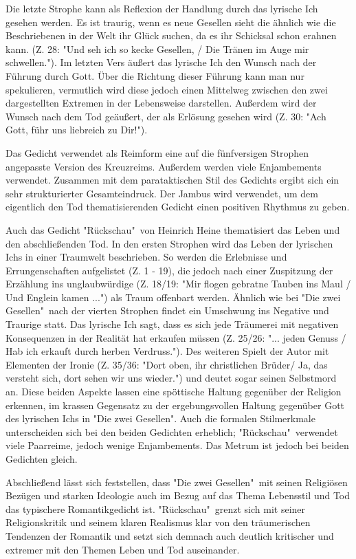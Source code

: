 \documentclass[11pt]{article}
\begin{document}
Die letzte Strophe kann als Reflexion der Handlung durch das lyrische Ich gesehen werden. Es ist traurig, wenn es neue Gesellen sieht die ähnlich wie die Beschriebenen in der Welt ihr Glück suchen, da es ihr Schicksal schon erahnen kann. (Z. 28: "Und seh ich so kecke Gesellen, /  Die Tränen im Auge mir schwellen."). Im letzten Vers äußert das lyrische Ich den Wunsch nach der Führung durch Gott. Über die Richtung dieser Führung kann man nur spekulieren, vermutlich wird diese jedoch einen Mittelweg zwischen den zwei dargestellten Extremen in der Lebensweise darstellen. Außerdem wird der Wunsch nach dem Tod geäußert, der als Erlösung gesehen wird (Z. 30: "Ach Gott, führ uns liebreich zu Dir!").

Das Gedicht verwendet als Reimform eine auf die fünfversigen Strophen angepasste Version des Kreuzreims. Außerdem werden viele Enjambements verwendet. Zusammen mit dem parataktischen Stil des Gedichts ergibt sich ein sehr strukturierter Gesamteindruck. Der Jambus wird verwendet, um dem eigentlich den Tod thematisierenden Gedicht einen positiven Rhythmus zu geben. 

Auch das Gedicht "Rückschau"\ von Heinrich Heine thematisiert das Leben und den abschließenden Tod. In den ersten Strophen wird das Leben der lyrischen Ichs in einer Traumwelt beschrieben. So werden die Erlebnisse und Errungenschaften aufgelistet (Z. 1 - 19), die jedoch nach einer Zuspitzung der Erzählung ins unglaubwürdige (Z. 18/19: "Mir flogen gebratne Tauben ins Maul / Und Englein kamen ...") als Traum  offenbart werden. Ähnlich wie bei "Die zwei Gesellen"\ nach der vierten Strophen findet ein Umschwung ins Negative und Traurige statt. Das lyrische Ich sagt, dass es sich jede Träumerei mit negativen Konsequenzen in der Realität hat erkaufen müssen (Z. 25/26: "... jeden Genuss / Hab ich erkauft durch herben Verdruss."). Des weiteren Spielt der Autor mit Elementen der Ironie (Z. 35/36: "Dort oben, ihr christlichen Brüder/ Ja, das versteht sich, dort sehen wir uns wieder.")  und deutet sogar seinen Selbstmord an. Diese beiden Aspekte lassen eine spöttische Haltung gegenüber der Religion erkennen, im krassen Gegensatz zu der ergebungsvollen Haltung gegenüber Gott des lyrischen Ichs in "Die zwei Gesellen". Auch die formalen Stilmerkmale unterscheiden sich bei den beiden Gedichten erheblich; "Rückschau"\ verwendet viele Paarreime, jedoch wenige Enjambements. Das Metrum ist jedoch bei beiden Gedichten gleich.

Abschließend lässt sich feststellen, dass "Die zwei Gesellen"\ mit seinen Religiösen Bezügen und starken Ideologie auch im Bezug auf das Thema Lebensstil und Tod das typischere Romantikgedicht ist. "Rückschau"\ grenzt sich mit seiner Religionskritik und seinem klaren Realismus klar von den träumerischen Tendenzen der Romantik und setzt sich demnach auch deutlich kritischer und extremer mit den Themen Leben und Tod auseinander.
\end{document}
